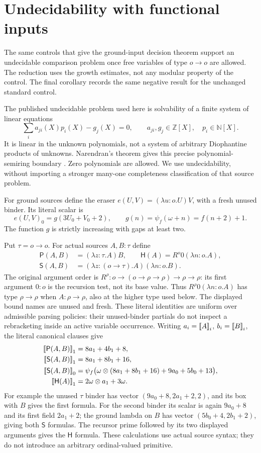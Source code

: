 \section{Undecidability with functional inputs}\label{sec:functional-hardness}

The same controls that give the ground-input decision theorem support
an undecidable comparison problem once free variables of type $o\to o$
are allowed. The reduction uses the growth estimates, not any modular
property of the control. The final corollary records the same negative
result for the unchanged standard control.

The published undecidable problem used here is solvability of a finite
system of linear equations
\[
 \sum_i a_{ji}(X)p_i(X)-g_j(X)=0,
 \qquad a_{ji},g_j\in\mathbb Z[X],\quad p_i\in\mathbb N[X].
\]
It is linear in the unknown polynomials, not a system of arbitrary
Diophantine products of unknowns.  Narendran's theorem gives this precise polynomial-semiring boundary
\cite{narendran}.
Zero polynomials are allowed.  We use undecidability, without importing a
stronger many-one completeness classification of that source problem.

For ground sources define the eraser $e(U,V)=(\lambda u:o.U)V$,
with a fresh unused binder. Its literal scalar is
\[
 e(U,V)_0=g(3U_0+V_0+2),\qquad g(n)=\psi_f(\omega+n)=f(n+2)+1.
\]
The function $g$ is strictly increasing with gaps at least two.

Put $\tau=o\to o$.  For actual sources $A,B:\tau$ define
\begin{align*}
 \mathsf P(A,B)&=(\lambda z:\tau.A)B,\qquad
 \mathsf H(A)=R^o0(\lambda n:o.A),\\
 \mathsf S(A,B)&=(\lambda z:(o\to\tau).A)(\lambda n:o.B).
\end{align*}
The original argument order is
$R^\rho:o\to(o\to\rho\to\rho)\to\rho\to\rho$:
its first argument $0:o$ is the recursion test, not its base value.
Thus $R^\rho0(\lambda n:o.A)$ has type $\rho\to\rho$
when $A:\rho\to\rho$, also at the higher type used below.
The displayed bound names are unused and fresh. These literal identities
are uniform over admissible parsing policies: their unused-binder partials
do not inspect a rebracketing inside an active variable occurrence.  Writing
$a_i=\mathopen{[\![}A\mathclose{]\!]}_i$, $b_i=\mathopen{[\![}B\mathclose{]\!]}_i$, the literal canonical clauses give
\begin{align*}
 \can{\mathsf P(A,B)}_1&=8a_1+4b_1+8,\\
 \can{\mathsf S(A,B)}_1&=8a_1+8b_1+16,\\
 \can{\mathsf S(A,B)}_0
   &=\psi_f\bigl(\omega\otimes(8a_1+8b_1+16)+9a_0+5b_0+13\bigr),\\
 \can{\mathsf H(A)}_1&=2\omega\otimes a_1+3\omega.
\end{align*}
For example the unused $\tau$ binder has vector
$(9a_0+8,2a_1+2,2)$, and its box with $B$ gives the first formula.
For the second binder its scalar is again $9a_0+8$ and its first field
$2a_1+2$; the ground lambda on $B$ has vector
$(5b_0+4,2b_1+2)$, giving both $\mathsf S$ formulas.
The recursor prime followed by its two displayed arguments gives
the $\mathsf H$ formula.  These calculations use actual source syntax;
they do not introduce an arbitrary ordinal-valued primitive.

